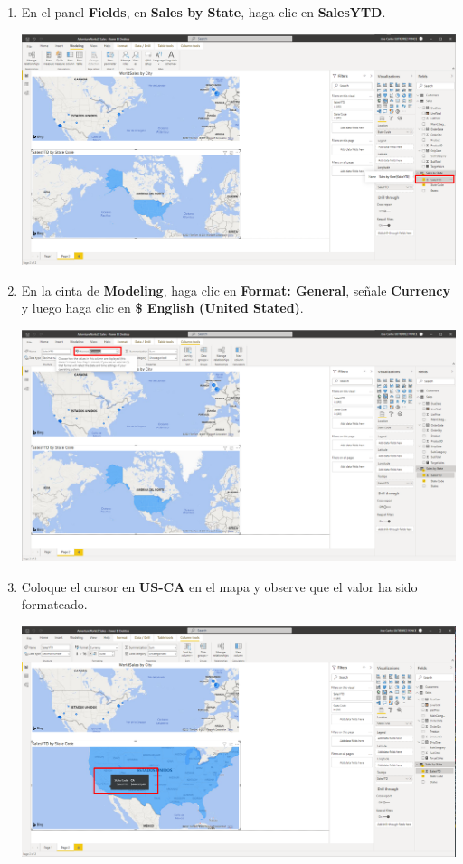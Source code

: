 \documentclass[12pt,letterpaper]{article}
\newcommand\tab[1][1cm]{\hspace*{#1}}
\begin{document}
\begin{enumerate}[\tab 1.]
\begin{center}
        \end{center}
        \item En el panel \textbf{Fields}, en \textbf{Sales by State}, haga clic en \textbf{SalesYTD}.
        \begin{center}
            \includegraphics[width=13cm]{./img/img131.png}
        \end{center}
        \item En la cinta de \textbf{Modeling}, haga clic en \textbf{Format: General}, señale \textbf{Currency} y luego haga clic en \textbf{\$ English (United Stated)}.
        \begin{center}
            \includegraphics[width=13cm]{./img/img132.png}
        \end{center}
        \item Coloque el cursor en \textbf{US-CA} en el mapa y observe que el valor ha sido formateado.
        \begin{center}
            \includegraphics[width=13cm]{./img/img133.png}

\end{center}
\end{enumerate}
\end{document}

